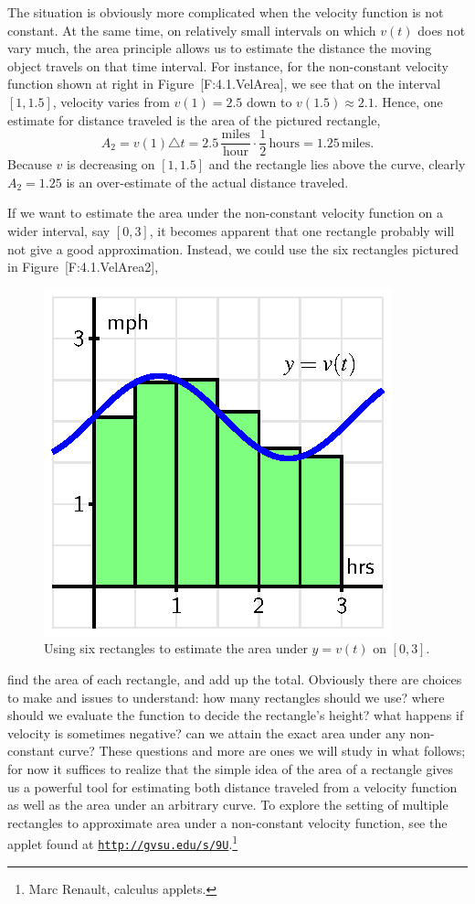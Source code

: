 The situation is obviously more complicated when the velocity function
is not constant. At the same time, on relatively small intervals on
which \(v(t)\) does not vary much, the area principle allows us to
estimate the distance the moving object travels on that time interval.
For instance, for the non-constant velocity function shown at right in
Figure~{[}F:4.1.VelArea{]}, we see that on the interval \([1,1.5]\),
velocity varies from \(v(1) = 2.5\) down to \(v(1.5) \approx 2.1\).
Hence, one estimate for distance traveled is the area of the pictured
rectangle,
\[A_2 = v(1) \triangle t = 2.5 \, \frac{\mbox{miles}}{\mbox{hour}} \cdot \frac{1}{2} \, \mbox{hours} = 1.25 \, \mbox{miles}.\]
Because \(v\) is decreasing on \([1,1.5]\) and the rectangle lies above
the curve, clearly \(A_2 = 1.25\) is an over-estimate of the actual
distance traveled.

If we want to estimate the area under the non-constant velocity function
on a wider interval, say \([0,3]\), it becomes apparent that one
rectangle probably will not give a good approximation. Instead, we could
use the six rectangles pictured in Figure~{[}F:4.1.VelArea2{]},

\begin{figure}[htbp]
\centering
\includegraphics{figures/4_1_VelArea2.eps}
\caption{Using six rectangles to estimate the area under \(y = v(t)\) on
\([0,3]\).{}}
\end{figure}

find the area of each rectangle, and add up the total. Obviously there
are choices to make and issues to understand: how many rectangles should
we use? where should we evaluate the function to decide the rectangle's
height? what happens if velocity is sometimes negative? can we attain
the exact area under any non-constant curve? These questions and more
are ones we will study in what follows; for now it suffices to realize
that the simple idea of the area of a rectangle gives us a powerful tool
for estimating both distance traveled from a velocity function as well
as the area under an arbitrary curve. To explore the setting of multiple
rectangles to approximate area under a non-constant velocity function,
see the applet found at
\href{http://gvsu.edu/s/9U}{\texttt{http://gvsu.edu/s/9U}}.\footnote{Marc
  Renault, calculus applets.}

